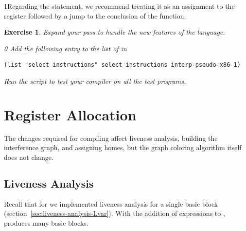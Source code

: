\documentclass[7x10]{TimesAPriori_MIT}%
\def\racketEd{0}
\def\pythonEd{1}
\def\edition{0}
\newcommand{\python}[1]{{\if\edition\pythonEd #1\fi}}
\newtheorem{exercise}[theorem]{Exercise}
\numberwithin{theorem}{chapter}
\numberwithin{definition}{chapter}
\numberwithin{equation}{chapter}
\begin{document}
\python{Regarding the  statement, we recommend treating it
  as an assignment to the \key{rax} register followed by a jump to the
  conclusion of the \code{main} function.}

\begin{exercise}\normalfont\normalsize
Expand your  pass to handle the new
features of the \LangCIf{} language.
%
{\if\edition\racketEd
Add the following entry to the list of  in
\begin{lstlisting}
(list "select_instructions" select_instructions interp-pseudo-x86-1)
\end{lstlisting}
\fi}
%
Run the script to test your compiler on all the test programs.
\end{exercise}

\section{Register Allocation}
\label{sec:register-allocation-Lif}

The changes required for compiling \LangIf{} affect liveness analysis,
building the interference graph, and assigning homes, but the graph
coloring algorithm itself does not change.

\subsection{Liveness Analysis}
\label{sec:liveness-analysis-Lif}

Recall that for \LangVar{} we implemented liveness analysis for a
single basic block (section~\ref{sec:liveness-analysis-Lvar}).  With
the addition of  expressions to \LangIf{},
 produces many basic blocks.

\end{document}
